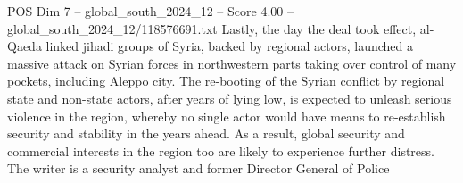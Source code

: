 \begin{textsample}{POS Dim 7 – global\_south\_2024\_12 – Score 4.00 – global\_south\_2024\_12/118576691.txt}
Lastly, the day the deal took effect, al-Qaeda linked jihadi groups of Syria, backed by regional actors, launched a massive attack on Syrian forces in northwestern parts taking over control of many pockets, including Aleppo city.
The re-booting of the Syrian conflict by regional state and non-state actors, after years of lying low, is expected to unleash serious violence in the region, whereby no single actor would have means to re-establish security and stability in the years ahead.
As a result, global security and commercial interests in the region too are likely to experience further distress.
The writer is a security analyst and former Director General of Police

\end{textsample}
